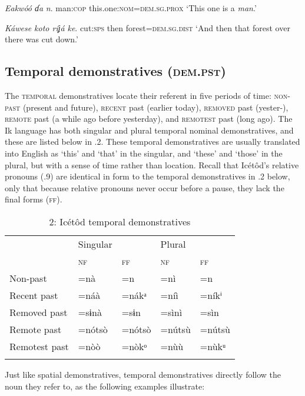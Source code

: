 \textit{Eakwóó   ɗa} \textit{n}.
man:\textsc{cop}  this.one:\textsc{nom}=\textsc{dem.sg.prox}
‘This one is a \textit{man}.’




\textit{Káwese   koto   ríʝá} \textit{ke}.
cut:\textsc{sps}   then   forest=\textsc{dem.sg.dist}
‘And then that forest over there was cut down.’






\subsection{Temporal demonstratives (\textsc{dem.pst})}


The \textsc{temporal} demonstratives locate their referent in five periods of time: \textsc{non-past} (present and future), \textsc{recent} past (earlier today), \textsc{removed} past (yester-), \textsc{remote} past (a while ago before yesterday), and \textsc{remotest} past (long ago). The Ik language has both singular and plural temporal nominal demonstratives, and these are listed below in .2. These temporal demonstratives are usually translated into English as ‘this’ and ‘that’ in the singular, and ‘these’ and ‘those’ in the plural, but with a sense of time rather than location. Recall that Icétôd’s relative pronouns (.9) are identical in form to the temporal demonstratives in .2 below, only that because relative pronouns never occur before a pause, they lack the final forms (\textsc{ff}).


\begin{table}
\caption{2: Icétôd temporal demonstratives}
\label{tab:6}


\begin{tabularx}{\textwidth}{XXXXX} & Singular &  & Plural & \\
\lsptoprule
& \textsc{nf} & \textsc{ff} & \textsc{nf} & \textsc{ff}\\
Non-past & =nà & =n & =nì & =n\\
Recent past & =náà & =nákᵃ & =níì & =níkⁱ\\
Removed past & =sɨnà & =sɨn & =sìnì & =sìn\\
Remote past & =nótsò & =nótsò & =nútsù & =nútsù\\
Remotest past & =nòò & =nòkᵒ & =nùù & =nùkᵘ\\
\lspbottomrule
\end{tabularx}
\end{table}
Just like spatial demonstratives, temporal demonstratives directly follow the noun they refer to, as the following examples illustrate:




